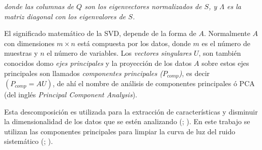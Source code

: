 \noindent \textit{donde las columnas de $Q$ son los eigenvectores normalizados de $S$, y $\Lambda$ es la matriz diagonal con los eigenvalores de $S$.}

El significado matemático de la SVD, depende de la forma de $A$. Normalmente $A$ con dimensiones $m\times n$ está compuesta por los datos, donde $m$ es el número de muestras y $n$ el número de variables. Los \textit{vectores singulares} $U$, son también conocidos domo \textit{ejes principales} y la proyección de los datos $A$ sobre estos ejes principales son llamados \textit{componentes principales ($P_{comp}$)}, es decir $(P_{comp}=AU)$, de ahí el nombre de análisis de componentes principales ó PCA (del inglés \textit{Principal Component Analysis}).

Esta descomposición es utilizada para la extracción de características y disminuir la dimensionalidad de los datos que se estén analizando (\cite{mcgurk2010principal}; \cite{medeiros2018principal}). En este trabajo se utilizan las componentes principales para limpiar la curva de luz del ruido sistemático (\cite{shin1999iterative}; \cite{bailey2012principal}).